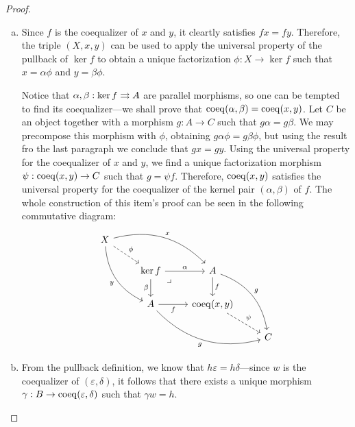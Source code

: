 \begin{proof}
\begin{enumerate}[(a)]\setlength\itemsep{0em}
\item Since \(f\) is the coequalizer of \(x\) and \(y\), it cleartly satisfies
  \(f x = f y\). Therefore, the triple \((X, x, y)\) can be used to apply the
  universal property of the pullback of \(\ker f\) to obtain a unique
  factorization \(\phi: X \to \ker f\) such that \(x = \alpha \phi\) and
  \(y = \beta \phi\).

  Notice that \(\alpha, \beta: \ker f \rightrightarrows A\) are parallel morphisms, so one
  can be tempted to find its coequalizer---we shall prove that
  \(\operatorname{coeq}(\alpha, \beta) = \operatorname{coeq}(x, y)\). Let \(C\) be an object together with a
  morphism \(g: A \to C\) such that \(g \alpha = g \beta\). We may precompose
  this morphism with \(\phi\), obtaining \(g \alpha \phi = g \beta \phi\), but
  using the result fro the last paragraph we conclude that \(g x = g y\). Using
  the universal property for the coequalizer of \(x\) and \(y\), we find a
  unique factorization morphism \(\psi: \operatorname{coeq}(x, y) \to C\) such that
  \(g = \psi f\). Therefore, \(\operatorname{coeq}(x, y)\) satisfies the universal property
  for the coequalizer of the kernel pair \((\alpha, \beta)\) of \(f\). The whole
  construction of this item's proof can be seen in the following commutative
  diagram:
  \[
  \begin{tikzcd}
  X \ar[rd, dashed, "\phi"]
  \ar[rrd, bend left, "x"]
  \ar[drd, bend right, "y"'] & & &
  \\
  &\ker f \ar[r, "\alpha"]
  \ar[rd, phantom, "\lrcorner", very near start]
  \ar[d, "\beta"']
  &A \ar[d, "f"] \ar[drd, bend left, "g"]
  &
  \\
  &A \ar[r, "f"'] \ar[rrd, "g"', bend right]
  &\Coeq(x, y) \ar[rd, dashed, "\psi"]
  &
  \\
  & & &C
  \end{tikzcd}
  \]

\item From the pullback definition, we know that
  \(h \varepsilon = h \delta\)---since \(w\) is the coequalizer of
  \((\varepsilon, \delta)\), it follows that there exists a unique morphism
  \(\gamma: B \to \operatorname{coeq}(\varepsilon, \delta)\) such that \(\gamma w = h\).


\end{enumerate}
\end{proof}
